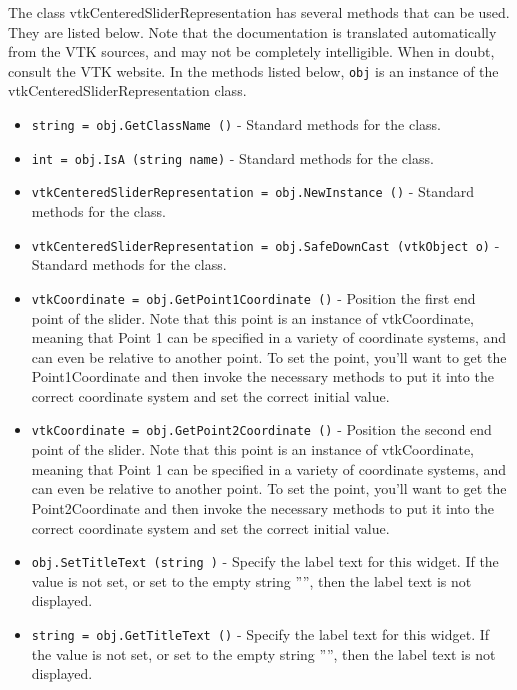 The class vtkCenteredSliderRepresentation has several methods that can be used.
  They are listed below.
Note that the documentation is translated automatically from the VTK sources,
and may not be completely intelligible.  When in doubt, consult the VTK website.
In the methods listed below, \verb|obj| is an instance of the vtkCenteredSliderRepresentation class.
\begin{itemize}
\item  \verb|string = obj.GetClassName ()| -  Standard methods for the class.

\item  \verb|int = obj.IsA (string name)| -  Standard methods for the class.

\item  \verb|vtkCenteredSliderRepresentation = obj.NewInstance ()| -  Standard methods for the class.

\item  \verb|vtkCenteredSliderRepresentation = obj.SafeDownCast (vtkObject o)| -  Standard methods for the class.

\item  \verb|vtkCoordinate = obj.GetPoint1Coordinate ()| -  Position the first end point of the slider. Note that this point is an
 instance of vtkCoordinate, meaning that Point 1 can be specified in a
 variety of coordinate systems, and can even be relative to another
 point. To set the point, you'll want to get the Point1Coordinate and
 then invoke the necessary methods to put it into the correct coordinate
 system and set the correct initial value.

\item  \verb|vtkCoordinate = obj.GetPoint2Coordinate ()| -  Position the second end point of the slider. Note that this point is an
 instance of vtkCoordinate, meaning that Point 1 can be specified in a
 variety of coordinate systems, and can even be relative to another
 point. To set the point, you'll want to get the Point2Coordinate and
 then invoke the necessary methods to put it into the correct coordinate
 system and set the correct initial value.

\item  \verb|obj.SetTitleText (string )| -  Specify the label text for this widget. If the value is not set, or set
 to the empty string '''', then the label text is not displayed.

\item  \verb|string = obj.GetTitleText ()| -  Specify the label text for this widget. If the value is not set, or set
 to the empty string '''', then the label text is not displayed.


\end{itemize}

